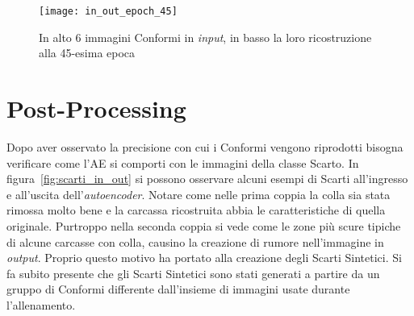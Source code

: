 \begin{figure}[ht] %
  \begin{center}
    \texttt{[image: in\_out\_epoch\_45]}
    \caption{In alto 6 immagini Conformi in \textit{input}, in basso la loro ricostruzione alla 45-esima epoca}
    \label{fig:epoch_45}
  \end{center}
\end{figure}

\clearpage
\section{Post-Processing}
Dopo aver osservato la precisione con cui i Conformi vengono riprodotti bisogna verificare come l'AE si comporti con le immagini della classe Scarto.
In figura~\ref{fig:scarti_in_out} si possono osservare alcuni esempi di Scarti all'ingresso e all'uscita dell'\textit{autoencoder}.
Notare come nelle prima coppia la colla sia stata rimossa molto bene e la carcassa ricostruita abbia le caratteristiche di quella originale.
Purtroppo nella seconda coppia si vede come le zone più scure tipiche di alcune carcasse con colla, causino la creazione di rumore nell'immagine in \textit{output}.
Proprio questo motivo ha portato alla creazione degli Scarti Sintetici.
Si fa subito presente che gli Scarti Sintetici sono stati generati a partire da un gruppo di Conformi differente dall'insieme di immagini usate durante l'allenamento.

